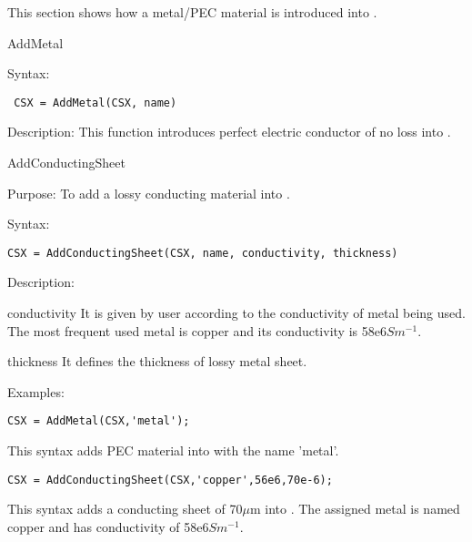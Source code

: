 This section shows how a metal/PEC material is introduced into
 \hyperref[CSX]{}.
 
\begin{FontNameFunct}{AddMetal}
\end{FontNameFunct}

\begin{FontDescr}{Syntax:}
  \begin{lstlisting}
 CSX = AddMetal(CSX, name)
  \end{lstlisting}
\end{FontDescr}  

\begin{FontDescr}{Description:}
This function introduces perfect electric conductor of no loss into \hyperref[CSX]{}.
\end{FontDescr}

 
\begin{FontNameFunct}{AddConductingSheet}
\end{FontNameFunct}

\begin{FontDescr}{Purpose:}
To add a lossy conducting material into \hyperref[CSX]{}.
\end{FontDescr}

\begin{FontDescr}{Syntax:}
  \begin{lstlisting}
CSX = AddConductingSheet(CSX, name, conductivity, thickness)
  \end{lstlisting}
\end{FontDescr} 

\begin{FontDescr}{Description:}

\begin{FontPara}{conductivity}
It is given by user according to the conductivity of metal being used. The most frequent used metal is copper and its conductivity is 58e6$Sm^{-1}$.    
\end{FontPara}

 \begin{FontPara}{thickness}
 It defines the thickness of lossy metal sheet.     
 \end{FontPara}
\end{FontDescr} 

\begin{FontDescr}{Examples:} 

\begin{lstlisting} 
CSX = AddMetal(CSX,'metal'); 
\end{lstlisting}
This syntax adds PEC material into \hyperref[CSX]{} with the name 'metal'. \\

\begin{lstlisting} 
CSX = AddConductingSheet(CSX,'copper',56e6,70e-6);
\end{lstlisting}
This syntax adds a conducting sheet of 70$\mu$m into \hyperref[CSX]{}. The assigned metal is named copper and has conductivity of 58e6$Sm^{-1}$.  

 \end{FontDescr} 
 
 
 
 